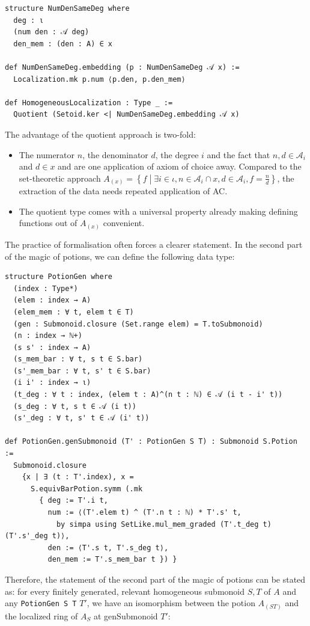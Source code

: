 \documentclass[graybox]{svmult}
\begin{document}
\begin{lstlisting}
structure NumDenSameDeg where
  deg : ι
  (num den : 𝒜 deg)
  den_mem : (den : A) ∈ x

def NumDenSameDeg.embedding (p : NumDenSameDeg 𝒜 x) :=
  Localization.mk p.num ⟨p.den, p.den_mem⟩

def HomogeneousLocalization : Type _ :=
  Quotient (Setoid.ker <| NumDenSameDeg.embedding 𝒜 x)
\end{lstlisting}

The advantage of the quotient approach is two-fold:
\begin{itemize}
  \item The numerator $n$, the denominator $d$, the degree $i$ and the fact that $n, d \in \mathcal{A}_i$ and $d \in x$ and  are one application of axiom of choice away.
  Compared to the set-theoretic approach $A_{(x)} = \left\{f\middle|\exists i \in \iota, n \in \mathcal{A}_i \cap x, d \in \mathcal{A}_i, f = \frac{n}{d}\right\}$, the extraction of the data needs repeated application of AC.
  \item The quotient type comes with a universal property already making defining functions out of $A_{(x)}$ convenient.
\end{itemize}

The practice of formalisation often forces a clearer statement.
In the second part of the magic of potions, we can define the following data type:

\begin{lstlisting}
structure PotionGen where
  (index : Type*)
  (elem : index → A)
  (elem_mem : ∀ t, elem t ∈ T)
  (gen : Submonoid.closure (Set.range elem) = T.toSubmonoid)
  (n : index → ℕ+)
  (s s' : index → A)
  (s_mem_bar : ∀ t, s t ∈ S.bar)
  (s'_mem_bar : ∀ t, s' t ∈ S.bar)
  (i i' : index → ι)
  (t_deg : ∀ t : index, (elem t : A)^(n t : ℕ) ∈ 𝒜 (i t - i' t))
  (s_deg : ∀ t, s t ∈ 𝒜 (i t))
  (s'_deg : ∀ t, s' t ∈ 𝒜 (i' t))

def PotionGen.genSubmonoid (T' : PotionGen S T) : Submonoid S.Potion :=
  Submonoid.closure
    {x | ∃ (t : T'.index), x =
      S.equivBarPotion.symm (.mk
        { deg := T'.i t,
          num := ⟨(T'.elem t) ^ (T'.n t : ℕ) * T'.s' t,
            by simpa using SetLike.mul_mem_graded (T'.t_deg t) (T'.s'_deg t)⟩,
          den := ⟨T'.s t, T'.s_deg t⟩,
          den_mem := T'.s_mem_bar t }) }
\end{lstlisting}

Therefore, the statement of the second part of the magic of potions can be stated as:
for every finitely generated, relevant homogeneous submonoid $S, T$ of $A$ and any \lstinline|PotionGen S T| $T'$, we have an isomorphism between
the potion $A_{(ST)}$ and the localized ring of $A_S$ at genSubmonoid $T'$:
\end{document}
